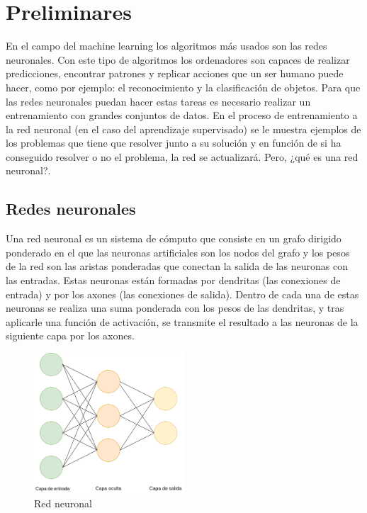 \chapter{Preliminares} \label{preliminares}
En el campo del machine learning los algoritmos más usados son las redes neuronales. Con este tipo de algoritmos los ordenadores son capaces de realizar predicciones, encontrar patrones y replicar acciones que un ser humano puede hacer, como por ejemplo: el reconocimiento y la clasificación de objetos. Para que las redes neuronales puedan hacer estas tareas es necesario realizar un entrenamiento con grandes conjuntos de datos. En el proceso de entrenamiento a la red neuronal (en el caso del aprendizaje supervisado) se le muestra ejemplos de los problemas que tiene que resolver junto a su solución y en función de si ha conseguido resolver o no el problema, la red se actualizará. Pero, ¿qué es una red neuronal?.

\section{Redes neuronales}
Una red neuronal \cite{RefWorks:RefID:22-jain1996artificial} es un sistema de cómputo que consiste en un grafo dirigido ponderado en el que las neuronas artificiales son los nodos del grafo y los pesos de la red son las  aristas ponderadas que conectan la salida de las neuronas con las entradas. Estas neuronas están formadas por dendritas (las conexiones de entrada) y por los axones (las conexiones de salida). Dentro de cada una de estas neuronas se realiza una suma ponderada con los pesos de las dendritas, y tras aplicarle una función de activación, se transmite el resultado a las neuronas de la siguiente capa por los axones. 

\begin{figure}
    \centering
    \includegraphics[width=0.5\textwidth]{imagenes/fdnn.drawio.png} 
    \caption{Red neuronal}
\end{figure}

